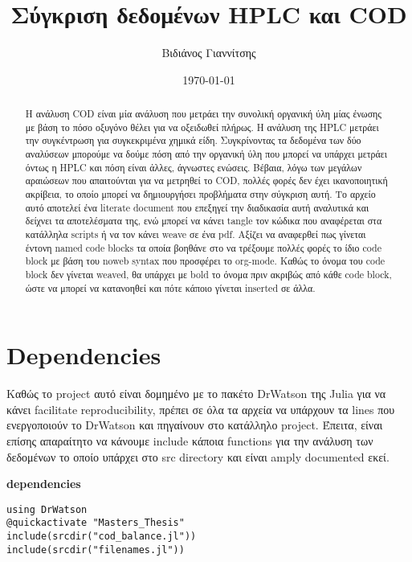 \documentclass[11pt]{article}
\author{Βιδιάνος Γιαννίτσης}
\date{\today}
\title{Σύγκριση δεδομένων HPLC και COD}
\begin{document}
\maketitle
\tableofcontents

\begin{abstract}
Η ανάλυση COD είναι μία ανάλυση που μετράει την συνολική οργανική ύλη μίας ένωσης με βάση το πόσο οξυγόνο θέλει για να οξειδωθεί πλήρως. Η ανάλυση της HPLC μετράει την συγκέντρωση για συγκεκριμένα χημικά είδη. Συγκρίνοντας τα δεδομένα των δύο αναλύσεων μπορούμε να δούμε πόση από την οργανική ύλη που μπορεί να υπάρχει μετράει όντως η HPLC και πόση είναι άλλες, άγνωστες ενώσεις. Βέβαια, λόγω των μεγάλων αραιώσεων που απαιτούνται για να μετρηθεί το COD, πολλές φορές δεν έχει ικανοποιητική ακρίβεια, το οποίο μπορεί να δημιουργήσει προβλήματα στην σύγκριση αυτή. Το αρχείο αυτό αποτελεί ένα literate document που επεξηγεί την διαδικασία αυτή αναλυτικά και δείχνει τα αποτελέσματα της, ενώ μπορεί να κάνει tangle τον κώδικα που αναφέρεται στα κατάλληλα scripts ή να τον κάνει weave σε ένα pdf. Αξίζει να αναφερθεί πως γίνεται έντονη named code blocks τα οποία βοηθάνε στο να τρέξουμε πολλές φορές το ίδιο code block με βάση του noweb syntax που προσφέρει το org-mode. Καθώς το όνομα του code block δεν γίνεται weaved, θα υπάρχει με bold το όνομα πριν ακριβώς από κάθε code block, ώστε να μπορεί να κατανοηθεί και πότε κάποιο γίνεται inserted σε άλλα.
\end{abstract}

\pagebreak
\section{Dependencies}
\label{sec:orge0e0952}
Καθώς το project αυτό είναι δομημένο με το πακέτο DrWatson της Julia για να κάνει facilitate reproducibility, πρέπει σε όλα τα αρχεία να υπάρχουν τα lines που ενεργοποιούν το DrWatson και πηγαίνουν στο κατάλληλο project. Έπειτα, είναι επίσης απαραίτητο να κάνουμε include κάποια functions για την ανάλυση των δεδομένων το οποίο υπάρχει στο src directory και είναι amply documented εκεί.

\textbf{dependencies}
\begin{verbatim}
using DrWatson
@quickactivate "Masters_Thesis"
include(srcdir("cod_balance.jl"))
include(srcdir("filenames.jl"))
\end{verbatim}
\end{document}
